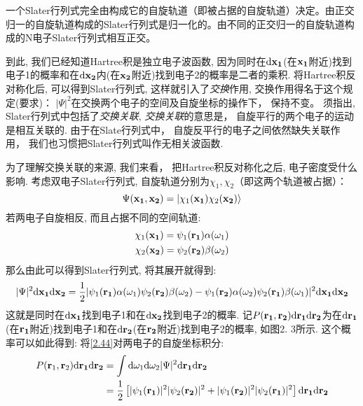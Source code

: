 一个Slater行列式完全由构成它的自旋轨道（即被占据的自旋轨道）决定。由正交归一的自旋轨道构成的Slater行列式是归一化的。由不同的正交归一的自旋轨道构成的N电子Slater行列式相互正交。


到此, 
我们已经知道Hartree积是独立电子波函数, 
因为同时在$\dd\bo{x_1}$(在$\mathbf{x_1}$附近)找到电子1的概率和在$\dd\bo{x_2}$内(在$\mathbf{x_2}$附近)找到电子2的概率是二者的乘积. 
将Hartree积反对称化后, 
可以得到Slater行列式, 
这样就引入了\emph{交换}作用, 
交换作用得名于这个规定(要求)： $|\Psi|^2$在交换两个电子的空间及自旋坐标的操作下，
保持不变。 
须指出, 
Slater行列式中包括了\emph{交换关联}, 
\emph{交换关联}的意思是，
自旋平行的两个电子的运动是相互关联的. 
由于在Slate行列式中，
自旋反平行的电子之间依然缺失关联作用，
我们也习惯把Slater行列式叫作无相关波函数.


为了理解交换关联的来源, 
我们来看，
把Hartree积反对称化之后, 
电子密度受什么影响. 
考虑双电子Slater行列式, 
自旋轨道分别为$\chi_1,\chi_2$（即这两个轨道被占据）：
\begin{equation}
\Psi(\mathbf{x_1,x_2})=\Ket{\chi_1(\mathbf{x_1})\chi_2(\mathbf{x_2})}
\end{equation}
若两电子自旋相反, 
而且占据不同的空间轨道:
\begin{align}
\chi_1(\mathbf{x_1})=\psi_1(\mathbf{r_1})\alpha(\omega_1)\\
\chi_2(\mathbf{x_2})=\psi_2(\mathbf{r_2})\beta(\omega_2)
\end{align}
那么由此可以得到Slater行列式, 
将其展开就得到:
\begin{equation}
\label{2.44}
|\Psi|^2\dd\bo{x_1}\dd\bo{x_2}=\frac{1}{2}|\psi_1(\bo{r_1})\alpha(\omega_1)\psi_2(\bo{r_2})\beta(\omega_2)-\psi_1(\bo{r_2})\alpha(\omega_2)\psi_2(\bo{r_1})\beta(\omega_1)|^2\dd\bo{x_1}\dd\bo{x_2}
\end{equation}
这就是同时在$\dd\bo{x_1}$找到电子1和在$\dd\bo{x_2}$找到电子2的概率. 
记$P(\bo{r_1,r_2})\dd\bo{r_1}\dd\bo{r_2}$为在$\dd\bo{r_1}$(在$\mathbf{r_1}$附近)找到电子1和在$\dd\bo{r_2}$(在$\mathbf{r_2}$附近)找到电子2的概率, 
如图2.
3所示. 
这个概率可以如此得到: 将\ref{2.44}对两电子的自旋坐标积分:
\begin{align}
\label{2.45}
P(\mathbf{r}_1,\mathbf{r}_2)\dd\bo{r_1}\dd\bo{r_2}&=\int\dd\omega_1\dd\omega_2|\Psi|^2\db{r_1}\db{r_2}\notag\\
&=\frac{1}{2}\left[|\psi_1(\bo{r_1})|^2|\psi_2(\bo{r_2})|^2+|\psi_1(\bo{r_2})|^2|\psi_2(\bo{r_1})|^2\right]\db{r_1}\db{r_2}
\end{align}

